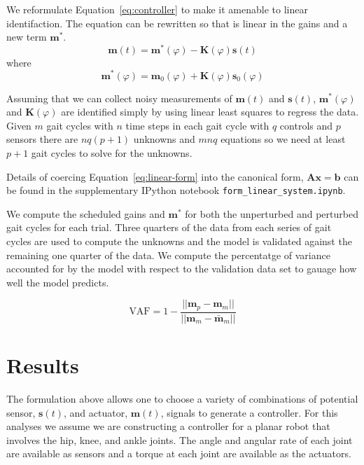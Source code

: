\documentclass{article}
\begin{document}
We reformulate Equation~\ref{eq:controller} to make it amenable to linear
identifaction. The equation can be rewritten so that is linear in the gains and
a new term $\mathbf{m}^*$.
%
\begin{equation}
  \mathbf{m}(t) = \mathbf{m}^*(\varphi) - \mathbf{K}(\varphi) \mathbf{s}(t)
  \label{eq:linear-form}
\end{equation}
%
where
%
\begin{equation}
  \mathbf{m}^*(\varphi) = \mathbf{m}_0(\varphi) + \mathbf{K}(\varphi) \mathbf{s}_0(\varphi)
\end{equation}

Assuming that we can collect noisy measurements of $\mathbf{m}(t)$
and $\mathbf{s}(t)$, $\mathbf{m}^*(\varphi)$ and $\mathbf{K}(\varphi)$ are
identified simply by using linear least squares to regress the data. Given $m$
gait cycles with $n$ time steps in each gait cycle with $q$ controls and $p$
sensors there are $nq(p + 1)$ unknowns and $mnq$ equations so we need at least
$p + 1$ gait cycles to solve for the unknowns.

Details of coercing Equation~\ref{eq:linear-form} into the canonical form,
$\mathbf{Ax}=\mathbf{b}$ can be found in the supplementary IPython notebook
\verb|form_linear_system.ipynb|.

We compute the scheduled gains and $\mathbf{m}^*$ for both the unperturbed and
perturbed gait cycles for each trial. Three quarters of the data from each
series of gait cycles are used to compute the unknowns and the model is
validated against the remaining one quarter of the data. We compute the
percentatge of variance accounted for by the model with respect to the
validation data set to gauage how well the model predicts.

\begin{equation}
  \textrm{VAF} = 1 - \frac{||\mathbf{m}_p - \mathbf{m}_m||}
    {||\mathbf{m}_m - \bar{\mathbf{m}}_m||}
  \label{eq:vaf}
\end{equation}

\section*{Results}
%
The formulation above allows one to choose a variety of combinations of
potential sensor, $\mathbf{s}(t)$, and actuator, $\mathbf{m}(t)$, signals to
generate a controller. For this analyses we assume we are constructing a
controller for a planar robot that involves the hip, knee, and ankle joints.
The angle and angular rate of each joint are available as sensors and a torque
at each joint are available as the actuators.
\end{document}
